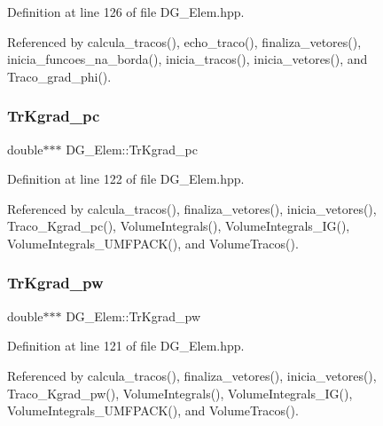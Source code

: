 Definition at line 126 of file D\+G\+\_\+\+Elem.\+hpp.



Referenced by calcula\+\_\+tracos(), echo\+\_\+traco(), finaliza\+\_\+vetores(), inicia\+\_\+funcoes\+\_\+na\+\_\+borda(), inicia\+\_\+tracos(), inicia\+\_\+vetores(), and Traco\+\_\+grad\+\_\+phi().

\mbox{\label{classDG__Elem_a57dac9aed0b175230089be51335e2dfa}} 
\subsubsection{\texorpdfstring{Tr\+Kgrad\+\_\+pc}{TrKgrad\_pc}}
{\footnotesize\ttfamily double$\ast$$\ast$$\ast$ D\+G\+\_\+\+Elem\+::\+Tr\+Kgrad\+\_\+pc\hspace{0.3cm}{\ttfamily [private]}}



Definition at line 122 of file D\+G\+\_\+\+Elem.\+hpp.



Referenced by calcula\+\_\+tracos(), finaliza\+\_\+vetores(), inicia\+\_\+vetores(), Traco\+\_\+\+Kgrad\+\_\+pc(), Volume\+Integrals(), Volume\+Integrals\+\_\+\+I\+G(), Volume\+Integrals\+\_\+\+U\+M\+F\+P\+A\+C\+K(), and Volume\+Tracos().

\mbox{\label{classDG__Elem_a9c510976b9964cc09f695b5c1becbc2e}} 
\subsubsection{\texorpdfstring{Tr\+Kgrad\+\_\+pw}{TrKgrad\_pw}}
{\footnotesize\ttfamily double$\ast$$\ast$$\ast$ D\+G\+\_\+\+Elem\+::\+Tr\+Kgrad\+\_\+pw\hspace{0.3cm}{\ttfamily [private]}}



Definition at line 121 of file D\+G\+\_\+\+Elem.\+hpp.



Referenced by calcula\+\_\+tracos(), finaliza\+\_\+vetores(), inicia\+\_\+vetores(), Traco\+\_\+\+Kgrad\+\_\+pw(), Volume\+Integrals(), Volume\+Integrals\+\_\+\+I\+G(), Volume\+Integrals\+\_\+\+U\+M\+F\+P\+A\+C\+K(), and Volume\+Tracos().

